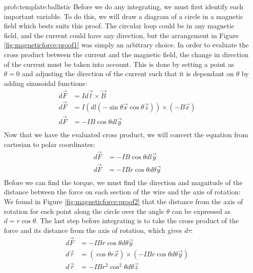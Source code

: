 \begin{solution}{prob:template:ballistic}\label{soln:template:ballistic}
	Before we do any integrating, we must first identify each important variable. To do this, we will draw a diagram of a circle in a magnetic field which bests suits this proof. The circular loop could be in any magnetic field, and the current could have any direction, but the arrangement in Figure \ref{fig:magneticforce:proof1} was simply an arbitrary choice.
	In order to evaluate the cross product between the current and the magnetic field, the change in direction of the current must be taken into account. This is done by setting a point as $\theta = 0$ and adjusting the direction of the current such that it is dependant on $\theta$ by adding sinusoidal functions:
	\begin{align*}
	d\vec F &= Id\vec l \times \vec B\\
	d\vec F &= I(d l(-\sin\theta \vec x \cos\theta \vec z)) \times  (-B\vec x)\\
	d\vec F &= -IB\cos\theta dl \vec y\\
	\end{align*}
	Now that we have the evaluated cross product, we will convert the equation from cartesian to polar coordinates:
	\begin{align*}
	d\vec F &= -IB\cos\theta dl \vec y\\
	d\vec F &= -IBr\cos\theta d\theta \vec y\\
	\end{align*}
	Before we can find the torque, we must find the direction and magnitude of the distance between the force on each section of the wire and the axis of rotation:
	We found in Figure \ref{fig:magneticforce:proof2} that the distance from the axis of rotation for each point along the circle over the angle $\theta$ can be expressed as $d = r\cos{\theta}$. The last step before integrating is to take the cross product of the force and its distance from the axis of rotation, which gives $d\tau$:
	\begin{align*}
	d\vec F &= -IBr\cos\theta d\theta \vec y\\
	d\vec \tau &= (\cos\theta r \vec x) \times (-IBr\cos\theta d\theta \vec y) \\
	d\vec \tau &= -IBr^2 \cos^2\theta d\theta \vec z \\

\end{align*}
\end{solution}
